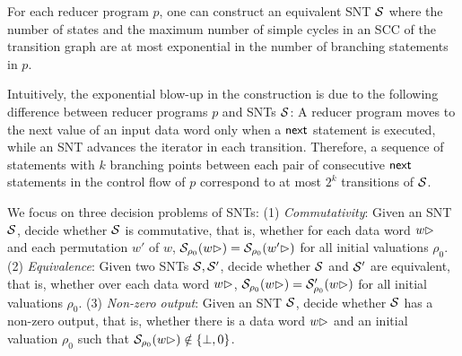 \vspace{-8mm}


\begin{proposition}\label{prop-mrprog-to-snt}
For each reducer program $p$, one can construct an equivalent SNT ${\mathcal{S} }$ where the number of states and the maximum number of simple cycles in an SCC of the transition graph are at most exponential in the number of branching statements in $p$. 
\end{proposition}
Intuitively, the exponential blow-up in the construction is due to the following difference between reducer programs $p$ and SNTs ${\mathcal{S} }$: A reducer program moves to the next value of an input data word only when a $\mathsf{next}$ statement is executed, while an SNT advances the iterator in each transition. Therefore, a sequence of statements with $k$ branching points between each pair of consecutive $\mathsf{next}$ statements in the control flow of $p$ correspond to at most $2^k$ transitions of ${\mathcal{S} }$.



%
%
%

We focus on three decision problems of SNTs: (1) \emph{Commutativity}: Given an SNT ${\mathcal{S} }$, decide whether ${\mathcal{S} }$ is commutative, that is, whether for each data word $w\rhd$ and each permutation $w'$ of $w$, ${\mathcal{S} }_{\rho_0}(w\rhd)={\mathcal{S} }_{\rho_0}(w'\rhd)$ for all initial valuations $\rho_0$. (2) \emph{Equivalence}: Given two SNTs ${\mathcal{S} },{\mathcal{S} }'$, decide whether ${\mathcal{S} }$ and ${\mathcal{S} }'$ are equivalent, that is, whether over each data word $w\rhd$, ${\mathcal{S} }_{\rho_0}(w\rhd)={\mathcal{S} }'_{\rho_0}(w\rhd)$ for all initial valuations $\rho_0$. (3) \emph{Non-zero output}: Given an SNT ${\mathcal{S} }$, decide whether ${\mathcal{S} }$ has a non-zero output, that is, whether there is a data word $w\rhd$ and an initial valuation $\rho_0$ such that ${\mathcal{S} }_{\rho_0}(w\rhd)\notin \{\bot, 0\}$. 

